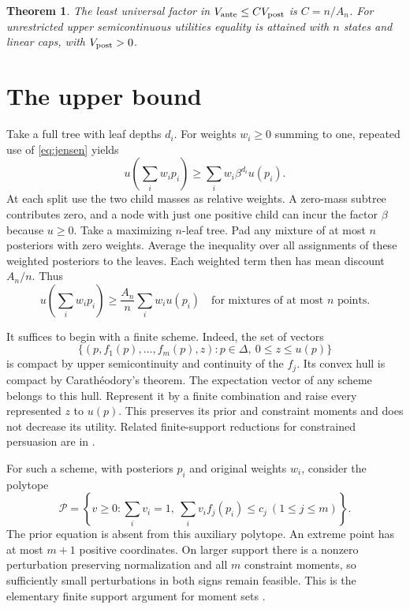 \documentclass[11pt,a4paper]{amsart}
\newtheorem{theorem}{Theorem}
\begin{document}
\begin{theorem}\label{thm:main}
The least universal factor in \(V_{\rm ante}\le C V_{\rm post}\) is \(C=n/A_n\). For unrestricted upper semicontinuous utilities equality is attained with \(n\) states and linear caps, with \(V_{\rm post}>0\).
\end{theorem}

\section{The upper bound}

Take a full tree with leaf depths \(d_i\). For weights \(w_i\ge0\) summing to one, repeated use of \eqref{eq:jensen} yields
\[
 u\left(\sum_i w_i p_i\right)\ge \sum_i w_i\beta^{d_i}u(p_i).
\]
At each split use the two child masses as relative weights. A zero-mass subtree contributes zero, and a node with just one positive child can incur the factor \(\beta\) because \(u\ge0\). Take a maximizing \(n\)-leaf tree. Pad any mixture of at most \(n\) posteriors with zero weights. Average the inequality over all assignments of these weighted posteriors to the leaves. Each weighted term then has mean discount \(A_n/n\). Thus
\begin{equation}\label{eq:avg}
 u\left(\sum_i w_i p_i\right)\ge \frac{A_n}{n}\sum_i w_i u(p_i)
 \quad\text{for mixtures of at most \(n\) points}.
\end{equation}

It suffices to begin with a finite scheme. Indeed, the set of vectors
\[
 \bigl\{(p,f_1(p),\ldots,f_m(p),z):p\in\Delta,\ 0\le z\le u(p)\bigr\}
\]
is compact by upper semicontinuity and continuity of the \(f_j\). Its convex hull is compact by Carath\'eodory's theorem. The expectation vector of any scheme belongs to this hull. Represent it by a finite combination and raise every represented \(z\) to \(u(p)\). This preserves its prior and constraint moments and does not decrease its utility. Related finite-support reductions for constrained persuasion are in \cite{ds,btzlong}.

For such a scheme, with posteriors \(p_i\) and original weights \(w_i\), consider the polytope
\[
 \mathcal P=\left\{v\ge0:\sum_i v_i=1,\
                    \sum_i v_i f_j(p_i)\le c_j\ (1\le j\le m)\right\}.
\]
The prior equation is absent from this auxiliary polytope. An extreme point has at most \(m+1\) positive coordinates. On larger support there is a nonzero perturbation preserving normalization and all \(m\) constraint moments, so sufficiently small perturbations in both signs remain feasible. This is the elementary finite support argument for moment sets \cite{winkler}.
\end{document}
